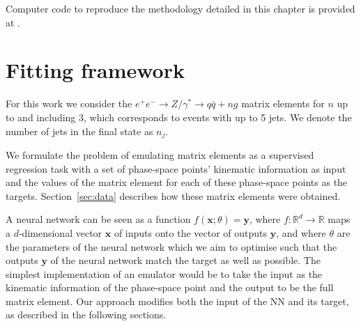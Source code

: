 \documentclass[main.tex]{subfiles}
\begin{document}
Computer code to reproduce the methodology detailed in this chapter is provided at \cite{fame_repo}.

\section{Fitting framework}\label{sec:fitting}
For this work we consider the $e^+e^-\rightarrow Z / \gamma^{*} \rightarrow q\bar q +n g$ matrix elements for $n$ up to and including 3, 
which corresponds to events with up to 5 jets. We denote the number of jets in the final state as $n_{j}$.

We formulate the problem of emulating matrix elements as a supervised regression task with a set of phase-space points' kinematic information as input and the 
values of the matrix element for each of these phase-space points as the targets. Section~\ref{sec:data} describes how these matrix elements were obtained.

A neural network can be seen as a function $f(\mathbf{x}; \theta) = \mathbf{y}$, where $f: \mathbb{R}^{d} \rightarrow \mathbb{R}$ maps a 
$d$-dimensional vector $\mathbf{x}$ of inputs onto the vector of outputs $\mathbf{y}$, and where $\theta$ are the parameters of the neural network which we aim to optimise 
such that the outputs $\mathbf{y}$ of the neural network match the target as well as possible. 
The simplest implementation of an emulator would be to take the input as the kinematic information of the phase-space point and the output to be the full matrix element. 
Our approach modifies both the input of the NN and its target, as described in the following sections.
\end{document}
